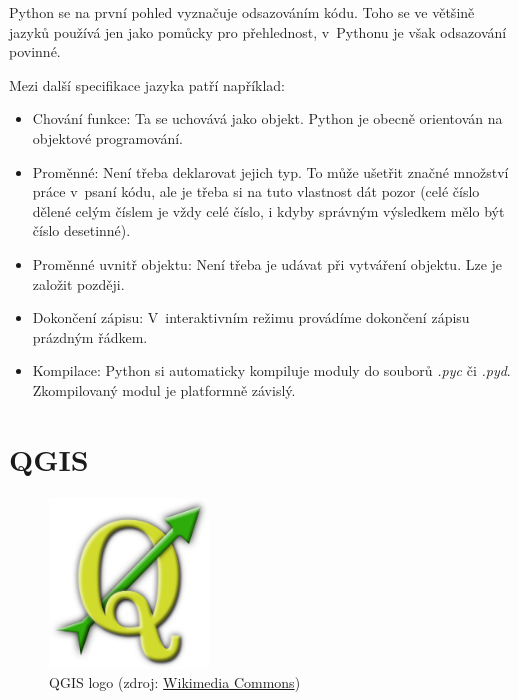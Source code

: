 Python se na první pohled vyznačuje odsazováním kódu. Toho se ve většině jazyků používá jen jako
pomůcky pro přehlednost, v~Pythonu je však odsazování povinné. 

Mezi další specifikace jazyka patří například: 
\begin{itemize}

	\item Chování funkce: Ta se uchovává jako objekt. Python je obecně orientován na objektové
	programování. 
	
	\item Proměnné: Není třeba deklarovat jejich typ. To může ušetřit značné množství práce
	v~psaní kódu, ale je třeba si na tuto vlastnost dát pozor (celé číslo dělené celým číslem je
	vždy celé číslo, i kdyby správným výsledkem mělo být číslo desetinné). 
	
	\item Proměnné uvnitř objektu: Není třeba je udávat při vytváření objektu. Lze je založit později. 
	\item Dokončení zápisu: V~interaktivním režimu provádíme dokončení zápisu prázdným řádkem. 
	\item Kompilace: Python si automaticky kompiluje moduly do souborů \textit{.pyc} či \textit{.pyd}.
	Zkompilovaný modul je platformně závislý. 

\end{itemize}


\section{QGIS}
\label{qgis}

  \begin{figure}[H]
    \centering
      \includegraphics[width=120pt]{./pictures/qgis.png}
      \caption[QGIS logo]{QGIS logo 
      (zdroj: \href{https://commons.wikimedia.org/wiki/File:QGIS\_logo.svg}{Wikimedia Commons})}
      \label{fig:qgis}
  \end{figure}

